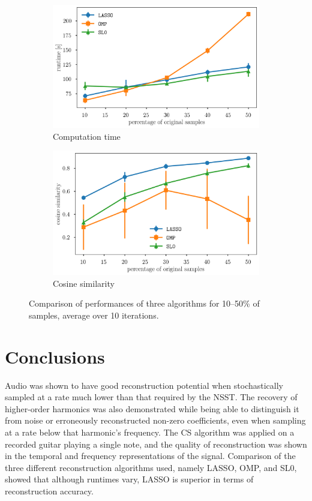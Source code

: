 \documentclass[10pt,a4paper,twoside]{article}
\begin{document}
\begin{figure}[!htb]
	\centering
	\begin{subfigure}{0.43\linewidth}
		\centering
		\includegraphics[width=\linewidth]{processtime.png}
		\caption{Computation time}
		\label{fig:process-time}
	\end{subfigure}
	\begin{subfigure}{0.43\linewidth}
		\centering
		\includegraphics[width=\linewidth]{cossim.png}
		\caption{Cosine similarity}
		\label{fig:cossim}
	\end{subfigure}
	\caption{Comparison of performances of three algorithms for 10--50\% of samples, average over 10 iterations.}
	\label{fig:comparison}
\end{figure}


\section{Conclusions}\label{sec:Conc}
Audio was shown to have good reconstruction potential when stochastically sampled at a rate much lower than that required by the NSST. The recovery of higher-order harmonics was also demonstrated while being able to distinguish it from noise or erroneously reconstructed non-zero coefficients, even when sampling at a rate below that harmonic's frequency. The CS algorithm was applied on a recorded guitar playing a single note, and the quality of reconstruction was shown in the temporal and frequency representations of the signal. Comparison of the three different reconstruction algorithms used, namely LASSO, OMP, and SL0, showed that although runtimes vary, LASSO is superior in terms of reconstruction accuracy.
\end{document}
